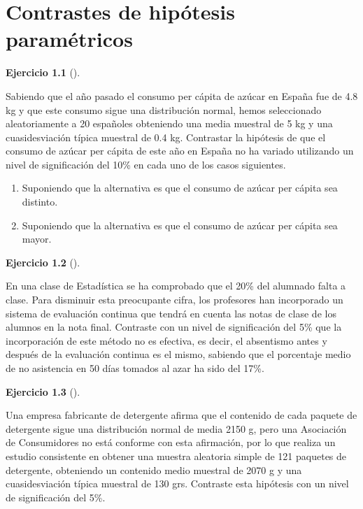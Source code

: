 \documentclass[
  a4paper,
]{scrreport}
\theoremstyle{definition}
\newtheorem{exercise}{Ejercicio}[chapter]
\theoremstyle{remark}
\begin{document}

\hypertarget{contrastes-de-hipuxf3tesis-paramuxe9tricos}{%
\chapter{Contrastes de hipótesis
paramétricos}\label{contrastes-de-hipuxf3tesis-paramuxe9tricos}}

\begin{exercise}[]\protect\hypertarget{exr-contraste-media-consumo-azucar}{}\label{exr-contraste-media-consumo-azucar}

Sabiendo que el año pasado el consumo per cápita de azúcar en España fue
de 4.8 kg y que este consumo sigue una distribución normal, hemos
seleccionado aleatoriamente a 20 españoles obteniendo una media muestral
de 5 kg y una cuasidesviación típica muestral de 0.4 kg. Contrastar la
hipótesis de que el consumo de azúcar per cápita de este año en España
no ha variado utilizando un nivel de significación del 10\% en cada uno
de los casos siguientes.

\begin{enumerate}
\def\labelenumi{\alph{enumi}.}
\item
  Suponiendo que la alternativa es que el consumo de azúcar per cápita
  sea distinto.
\item
  Suponiendo que la alternativa es que el consumo de azúcar per cápita
  sea mayor.
\end{enumerate}

\end{exercise}

\begin{exercise}[]\protect\hypertarget{exr-contraste-proporcion-asistencia-clase}{}\label{exr-contraste-proporcion-asistencia-clase}

En una clase de Estadística se ha comprobado que el 20\% del alumnado
falta a clase. Para disminuir esta preocupante cifra, los profesores han
incorporado un sistema de evaluación continua que tendrá en cuenta las
notas de clase de los alumnos en la nota final. Contraste con un nivel
de significación del 5\% que la incorporación de este método no es
efectiva, es decir, el absentismo antes y después de la evaluación
continua es el mismo, sabiendo que el porcentaje medio de no asistencia
en 50 días tomados al azar ha sido del 17\%.

\end{exercise}

\begin{exercise}[]\protect\hypertarget{exr-contraste-media-detergente}{}\label{exr-contraste-media-detergente}

Una empresa fabricante de detergente afirma que el contenido de cada
paquete de detergente sigue una distribución normal de media 2150 g,
pero una Asociación de Consumidores no está conforme con esta
afirmación, por lo que realiza un estudio consistente en obtener una
muestra aleatoria simple de 121 paquetes de detergente, obteniendo un
contenido medio muestral de 2070 g y una cuasidesviación típica muestral
de 130 grs. Contraste esta hipótesis con un nivel de significación del
5\%.

\end{exercise}
\end{document}

